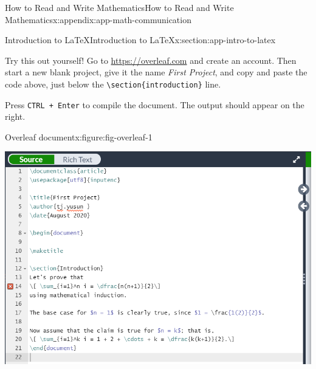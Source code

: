 \documentclass[oneside,10pt,]{book}
\newcommand{\mono}[1]{\texttt{#1}}
\newcommand{\alert}[1]{\textbf{\textit{#1}}}
\numberwithin{equation}{section}
\newenvironment{codedisplay}
{\VerbatimEnvironment\begin{center}\begin{lrbox}{\codedisplaybox}\begin{BVerbatim}}
{\end{BVerbatim}\end{lrbox}\usebox{\codedisplaybox}\end{center}}
\begin{document}
\begin{appendixptx}{How to Read and Write Mathematics}{}{How to Read and Write Mathematics}{}{}{x:appendix:app-math-communication}
\begin{sectionptx}{Introduction to \LaTeX{}}{}{Introduction to \LaTeX{}}{}{}{x:section:app-intro-to-latex}
Try this out yourself! Go to \href{https://overleaf.com}{https:\slash{}\slash{}overleaf.com} and create an account. Then start a new blank project, give it the name \emph{First Project}, and copy and paste the code above, just below the \mono{\textbackslash{}section\{introduction\}} line.%
\par
Press \mono{CTRL + Enter} to compile the document. The output should appear on the right.%
\begin{figureptx}{Overleaf document}{x:figure:fig-overleaf-1}{}%
\begin{image}{0.05}{0.9}{0.05}%
\includegraphics[width=\linewidth]{figs/latex-example-overleaf1.png}

\end{image}
\end{figureptx}
\end{sectionptx}
\end{appendixptx}
\end{document}
